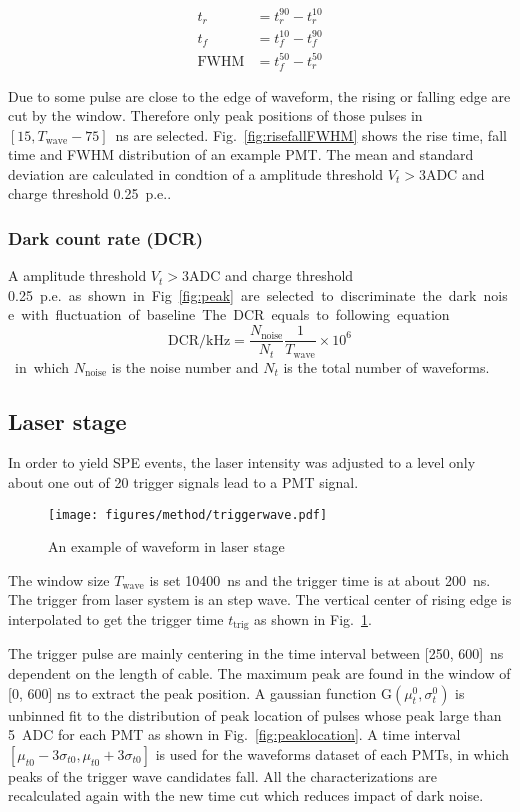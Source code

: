 \begin{align}
    t_r &= t^{90}_r - t^{10}_r\\
    t_f &= t^{10}_f - t^{90}_f\\
    \mathrm{FWHM} &= t^{50}_f - t^{50}_r
\end{align}

Due to some pulse are close to the edge of waveform, the rising or falling edge are cut by the window. Therefore only peak positions of those pulses in $[15, T_{\mathrm{wave}}-75]$\ ns are selected. Fig.~\ref{fig:risefallFWHM} shows the rise time, fall time and FWHM distribution of an example PMT. The mean and standard deviation are calculated in condtion of a amplitude threshold $V_{t}>3\mathrm{ADC}$ and charge threshold \SI{0.25}{p.e.}.

\subsubsection{Dark count rate (DCR)}
A amplitude threshold $V_{t}>3\mathrm{ADC}$ and charge threshold \SI{0.25}{p.e.} as shown in Fig.~\ref{fig:peak} are selected to discriminate the dark noise with fluctuation of baseline. The DCR equals to following equation
\begin{equation}
    \mathrm{DCR/kHz} = \frac{N_{\mathrm{noise}}}{N_{t}}\frac{1}{T_{\mathrm{wave}}}\times 10^{6}
\end{equation}
    in which $N_{\mathrm{noise}}$ is the noise number and $N_{t}$ is the total number of waveforms.

\subsection{Laser stage}
In order to yield SPE events, the laser intensity was adjusted to a level only
about one out of 20 trigger signals lead to a PMT signal.
\begin{figure}[!htbp]
    \centering
    \texttt{[image: figures/method/triggerwave.pdf]}
    \caption{An example of waveform in laser stage}
    \label{fig:triggertime}
\end{figure}
The window size $T_{\mathrm{wave}}$ is set \SI{10400}{ns} and the trigger time is at about \SI{200}{ns}. The trigger from laser system is an step wave. The vertical center of rising edge is interpolated to get the trigger time $t_{\mathrm{trig}}$ as shown in Fig.~\ref{fig:triggertime}.

The trigger pulse are mainly centering in the time interval between [250, 600]\ ns dependent on the length of cable. The maximum peak are found in the window of [0, 600] ns to extract the peak position. A gaussian function G$(\mu_t^0,\sigma_t^0)$ is unbinned fit to the distribution of peak location of pulses whose peak large than \SI{5}{ADC} for each PMT as shown in Fig.~\ref{fig:peaklocation}. A time interval $[\mu_{t0}-3\sigma_{t0}, \mu_{t0}+3\sigma_{t0}]$ is used for the waveforms dataset of each PMTs, in which peaks of the trigger wave candidates fall. All the characterizations are recalculated  again with the new time cut which reduces impact of dark noise.

